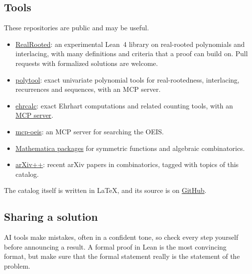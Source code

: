 \subsection[aiResearchTools]{Tools}

These repositories are public and may be useful.
\begin{itemize}
\item \href{https://github.com/PerAlexandersson/RealRooted}{
RealRooted}: an experimental Lean~4 library on real-rooted polynomials and
interlacing, with many definitions and criteria that a proof can build on.
Pull requests with formalized solutions are welcome.
\item \href{https://github.com/PerAlexandersson/polytool}{
polytool}: exact univariate polynomial tools for real-rootedness, interlacing,
recurrences and sequences, with an MCP server.
\item \href{https://github.com/PerAlexandersson/ehrcalc}{
ehrcalc}: exact Ehrhart computations and related counting tools, with an
\href{https://github.com/PerAlexandersson/ehrcalc/tree/main/mcp}{MCP server}.
\item \href{https://github.com/PerAlexandersson/mcp-oeis}{
mcp-oeis}: an MCP server for searching the OEIS.
\item \href{https://github.com/PerAlexandersson/Mathematica-packages}{
Mathematica packages} for symmetric functions and algebraic combinatorics.
\item \href{https://www.arxiv.symmetricfunctions.com}{arXiv++}: recent
arXiv papers in combinatorics, tagged with topics of this catalog.
\end{itemize}

The catalog itself is written in LaTeX, and its source is on
\href{https://github.com/PerAlexandersson/symmetricfunctions.com}{
GitHub}.

\subsection[aiResearchSharing]{Sharing a solution}

AI tools make mistakes, often in a confident tone, so check every step
yourself before announcing a result.  A formal proof in Lean is the most
convincing format, but make sure that the formal statement really is the
statement of the problem.

